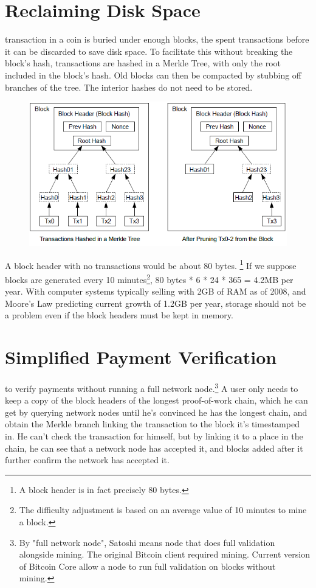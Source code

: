 \documentclass[nohyper]{tufte-handout}
\begin{document}
\section{Reclaiming Disk Space}\label{reclaiming-disk-space}

 transaction in a coin is buried under enough blocks, the
spent transactions before it can be discarded to save disk space. To
facilitate this without breaking the block's hash, transactions are
hashed in a Merkle Tree\cite[-1.7in]{mer80}\cite[-1.1in]{mas99}\cite[-0.25in]{hab97}, with only the root included in the block's hash. Old
blocks can then be compacted by stubbing off branches of the tree. The
interior hashes do not need to be stored.

\begin{figure}[!h]
\centering
\includegraphics[width=0.75\linewidth]{reclaiming-disk.png}
\end{figure}

A block header with no transactions would be about 80 bytes.  \footnote{A block header is in fact precisely 80 bytes.} If we
suppose blocks are generated every 10 minutes\footnote{The difficulty adjustment is based on an average value of 10 minutes to mine a block.}, 80 bytes * 6 * 24 * 365 =
4.2MB per year. With computer systems typically selling with 2GB of RAM
as of 2008, and Moore's Law predicting current growth of 1.2GB per year,
storage should not be a problem even if the block headers must be kept
in memory.


\section{Simplified Payment
Verification}\label{simplified-payment-verification}

 to verify payments without running a full network node.\footnote{By "full network node", Satoshi means node that does full validation alongside mining.  The original Bitcoin client required mining.  Current version of Bitcoin Core allow a node to run full validation on blocks without mining.} A user only needs to keep a copy of the block headers of the longest
proof-of-work chain, which he can get by querying network nodes until
he's convinced he has the longest chain, and obtain the Merkle branch
linking the transaction to the block it's timestamped in. He can't check
the transaction for himself, but by linking it to a place in the chain,
he can see that a network node has accepted it, and blocks added after
it further confirm the network has accepted it.
\end{document}
